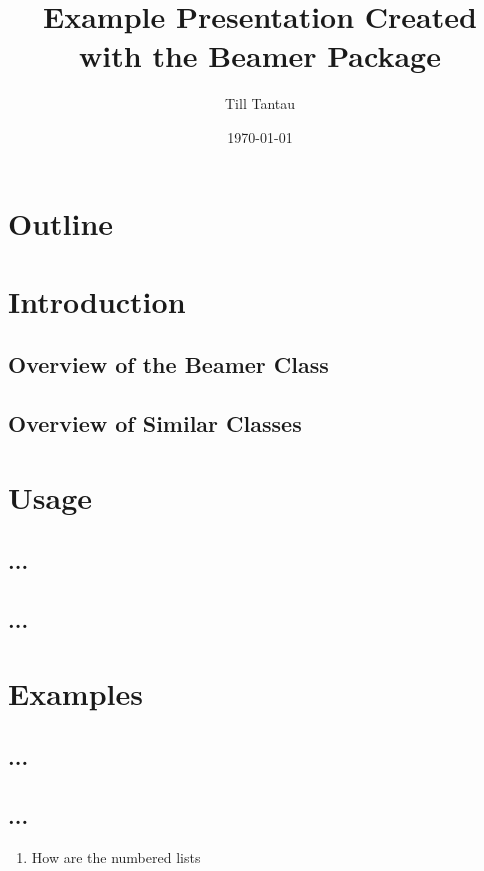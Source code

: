 \documentclass{beamer}
\title{Example Presentation Created with the Beamer Package}
\author{Till Tantau}
\date{\today}
\begin{document}
\begin{frame}
  \titlepage
  \end{frame}
  \section*{Outline}
\begin{frame}
    \tableofcontents
\end{frame}
    
\section{Introduction}
\subsection{Overview of the Beamer Class}
\subsection{Overview of Similar Classes}
\section{Usage}
\subsection{...}
\subsection{...}
\section{Examples}
\subsection{...}
\subsection{...}
\begin{frame}
\begin{enumerate}
\item How are the numbered lists
\end{enumerate}
\end{frame} %
\end{document}
